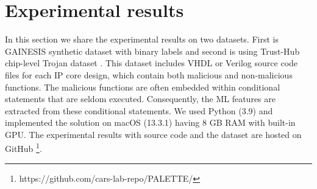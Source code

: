 \documentclass[9pt,conference]{IEEEtran}
\begin{document}
\section{Experimental results}
\label{sec:Results}
In this section we share the experimental results on two datasets. First is GAINESIS \cite{liakos2022gainesis} synthetic dataset with binary labels and second is using Trust-Hub chip-level Trojan dataset \cite{px6s-sm21-22}. This dataset includes VHDL or Verilog source code files for each IP core design, which contain both malicious and non-malicious functions. The malicious functions are often embedded within conditional statements that are seldom executed. Consequently, the ML features are extracted from these conditional statements. We used Python (3.9) and implemented the solution on macOS (13.3.1) having 8 GB RAM with built-in GPU. The experimental results with source code and the dataset are hosted on GitHub \footnote{https://github.com/cars-lab-repo/PALETTE/}.


\iffalse
\subsection{Source Dataset}
\label{Sec:Dataset}
For our experiment we have used the features extracted from TrustHub chip-level Trojan dataset based \cite{px6s-sm21-22} on RTL design using \textit{Code branching features}. The dataset includes VHDL or Verilog source code files for each IP core design, which contain both malicious and non-malicious functions. The malicious functions are often embedded within conditional statements that are seldom executed. Consequently, the machine learning features are extracted from these conditional statements. %

We also use synthetic dataset from GAINESIS which has two labels \{TF,TI\}. The results are share in the following sections.  

\fi

\iffalse
\begin{figure*}[ht]
  \centering
  \texttt{[image: figs/exp2.png]}
  \caption{Interpretation of conformal inference and derived use case for Hardware Trojan detection.}
  \label{fig:inference}
\end{figure*}
\fi
\end{document}
